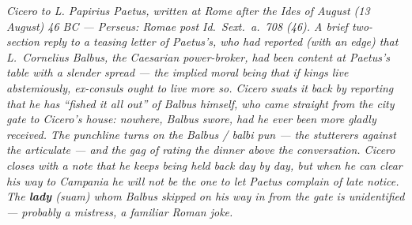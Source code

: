 
\textit{Cicero to L. Papirius Paetus, written at Rome after the
Ides of August (13 August) 46 BC --- Perseus: \textit{Romae post
Id.~Sext.~a.~708 (46)}. A brief two-section reply to a teasing
letter of Paetus's, who had reported (with an edge) that
L.~Cornelius Balbus, the Caesarian power-broker, had been
content at Paetus's table with a slender spread --- the implied
moral being that if kings live abstemiously, ex-consuls ought to
live more so. Cicero swats it back by reporting that he has
``fished it all out'' of Balbus himself, who came straight from
the city gate to Cicero's house: nowhere, Balbus swore, had he
ever been more gladly received. The punchline turns on the
Balbus / \textit{balbi} pun --- the stutterers against the
articulate --- and the gag of rating the dinner above the
conversation. Cicero closes with a note that he keeps being held
back day by day, but when he can clear his way to Campania he
will not be the one to let Paetus complain of late notice. The
\textbf{lady} (\textit{suam}) whom Balbus skipped on his way in
from the gate is unidentified --- probably a mistress, a familiar
Roman joke.}
